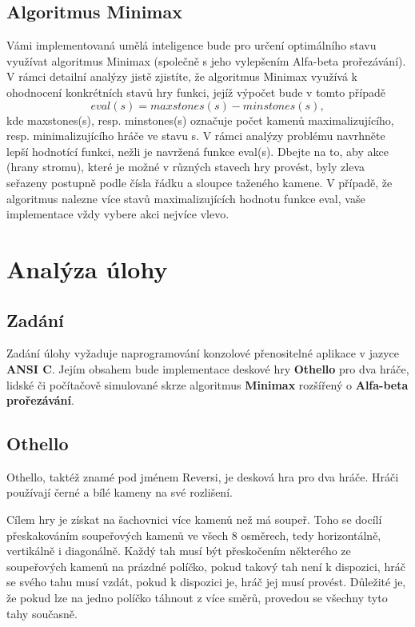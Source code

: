 \documentclass[
12pt,
a4paper,
pdftex,
czech,
titlepage
]{report}
\begin{document}
\section*{Algoritmus Minimax}
Vámi implementovaná umělá inteligence bude pro určení optimálního stavu využívat algoritmus
Minimax (společně s jeho vylepšením Alfa-beta prořezávání). V rámci detailní analýzy jistě zjistíte,
že algoritmus Minimax využívá k ohodnocení konkrétních stavů hry funkci, jejíž výpočet bude
v tomto případě
\[
    eval(s) = maxstones(s) - minstones(s),
\]
kde maxstones(s), resp. minstones(s) označuje počet kamenů maximalizujícího, resp. minimalizujícího hráče ve stavu s. V rámci analýzy problému navrhněte lepší hodnotící funkci, nežli je
navržená funkce eval(s).
Dbejte na to, aby akce (hrany stromu), které je možné v různých stavech hry provést, byly zleva
seřazeny postupně podle čísla řádku a sloupce taženého kamene. V případě, že algoritmus nalezne
více stavů maximalizujících hodnotu funkce eval, vaše implementace vždy vybere akci nejvíce
vlevo.

\chapter{Analýza úlohy}

\section{Zadání}
Zadání úlohy vyžaduje naprogramování konzolové přenositelné aplikace v jazyce \textbf{ANSI C}. Jejím obsahem bude implementace deskové hry \textbf{Othello} pro dva hráče, lidské či počítačově simulované skrze algoritmus \textbf{Minimax} rozšířený o \textbf{Alfa-beta prořezávání}.

\section{Othello}
Othello, taktéž znamé pod jménem Reversi, je desková hra pro dva hráče. Hráči používají černé a bílé kameny na své rozlišení. 

Cílem hry je získat na šachovnici více kamenů než má soupeř. Toho se docílí přeskakováním soupeřových kamenů ve všech 8 osměrech, tedy horizontálně, vertikálně i diagonálně. Každý tah musí být přeskočením některého ze soupeřových kamenů na prázdné políčko, pokud takový tah není k dispozici, hráč se svého tahu musí vzdát, pokud k dispozici je, hráč jej musí provést. Důležité je, že pokud lze na jedno políčko táhnout z více směrů, provedou se všechny tyto tahy současně.  
\end{document}
